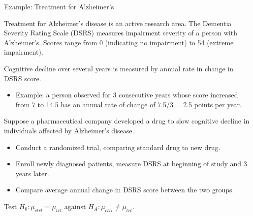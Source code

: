 \documentclass[
  ignorenonframetext,
  aspectratio=169]{beamer}
\providecommand{\tightlist}{%
  \setlength{\itemsep}{0pt}\setlength{\parskip}{0pt}}
\begin{document}
\begin{frame}{Example: Treatment for Alzheimer's}
\protect\hypertarget{example-treatment-for-alzheimers}{}
\small

Treatment for Alzheimer's disease is an active research area. The
Dementia Severity Rating Scale (DSRS) measures impairment severity of a
person with Alzheimer's. Scores range from 0 (indicating no impairment)
to 54 (extreme impairment).

Cognitive decline over several years is measured by annual rate in
change in DSRS score.

\begin{itemize}
\tightlist
\item
  Example: a person observed for 3 consecutive years whose score
  increased from 7 to 14.5 has an annual rate of change of 7.5/3 = 2.5
  points per year.
\end{itemize}

Suppose a pharmaceutical company developed a drug to slow cognitive
decline in individuals affected by Alzheimer's disease.

\begin{itemize}
\item
  Conduct a randomized trial, comparing standard drug to new drug.
\item
  Enroll newly diagnosed patients, measure DSRS at beginning of study
  and 3 years later.
\item
  Compare average annual change in DSRS score between the two groups.
\end{itemize}

Test \(H_0: \mu_{ctrl} = \mu_{trt}\) against
\(H_A: \mu_{ctrl} \neq \mu_{trt}\).
\end{frame}
\end{document}
